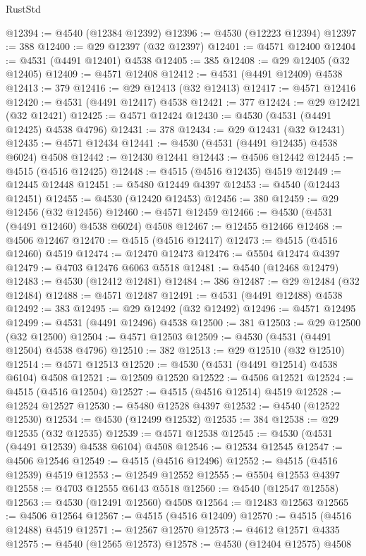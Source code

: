 \begin{lexlean}{RustStd}
\begin{coremodule}
@12394 := @4540 (@12384 @12392)
@12396 := @4530 (@12223 @12394)
@12397 := 388
@12400 := @29 @12397 (@32 @12397)
@12401 := @4571 @12400
@12404 := @4531 (@4491 @12401) @4538
@12405 := 385
@12408 := @29 @12405 (@32 @12405)
@12409 := @4571 @12408
@12412 := @4531 (@4491 @12409) @4538
@12413 := 379
@12416 := @29 @12413 (@32 @12413)
@12417 := @4571 @12416
@12420 := @4531 (@4491 @12417) @4538
@12421 := 377
@12424 := @29 @12421 (@32 @12421)
@12425 := @4571 @12424
@12430 := @4530 (@4531 (@4491 @12425) @4538 @4796)
@12431 := 378
@12434 := @29 @12431 (@32 @12431)
@12435 := @4571 @12434
@12441 := @4530 (@4531 (@4491 @12435) @4538 @6024) @4508
@12442 := @12430 @12441
@12443 := @4506 @12442
@12445 := @4515 (@4516 @12425)
@12448 := @4515 (@4516 @12435) @4519
@12449 := @12445 @12448
@12451 := @5480 @12449 @4397
@12453 := @4540 (@12443 @12451)
@12455 := @4530 (@12420 @12453)
@12456 := 380
@12459 := @29 @12456 (@32 @12456)
@12460 := @4571 @12459
@12466 := @4530 (@4531 (@4491 @12460) @4538 @6024) @4508
@12467 := @12455 @12466
@12468 := @4506 @12467
@12470 := @4515 (@4516 @12417)
@12473 := @4515 (@4516 @12460) @4519
@12474 := @12470 @12473
@12476 := @5504 @12474 @4397
@12479 := @4703 @12476 @6063 @5518
@12481 := @4540 (@12468 @12479)
@12483 := @4530 (@12412 @12481)
@12484 := 386
@12487 := @29 @12484 (@32 @12484)
@12488 := @4571 @12487
@12491 := @4531 (@4491 @12488) @4538
@12492 := 383
@12495 := @29 @12492 (@32 @12492)
@12496 := @4571 @12495
@12499 := @4531 (@4491 @12496) @4538
@12500 := 381
@12503 := @29 @12500 (@32 @12500)
@12504 := @4571 @12503
@12509 := @4530 (@4531 (@4491 @12504) @4538 @4796)
@12510 := 382
@12513 := @29 @12510 (@32 @12510)
@12514 := @4571 @12513
@12520 := @4530 (@4531 (@4491 @12514) @4538 @6104) @4508
@12521 := @12509 @12520
@12522 := @4506 @12521
@12524 := @4515 (@4516 @12504)
@12527 := @4515 (@4516 @12514) @4519
@12528 := @12524 @12527
@12530 := @5480 @12528 @4397
@12532 := @4540 (@12522 @12530)
@12534 := @4530 (@12499 @12532)
@12535 := 384
@12538 := @29 @12535 (@32 @12535)
@12539 := @4571 @12538
@12545 := @4530 (@4531 (@4491 @12539) @4538 @6104) @4508
@12546 := @12534 @12545
@12547 := @4506 @12546
@12549 := @4515 (@4516 @12496)
@12552 := @4515 (@4516 @12539) @4519
@12553 := @12549 @12552
@12555 := @5504 @12553 @4397
@12558 := @4703 @12555 @6143 @5518
@12560 := @4540 (@12547 @12558)
@12563 := @4530 (@12491 @12560) @4508
@12564 := @12483 @12563
@12565 := @4506 @12564
@12567 := @4515 (@4516 @12409)
@12570 := @4515 (@4516 @12488) @4519
@12571 := @12567 @12570
@12573 := @4612 @12571 @4335
@12575 := @4540 (@12565 @12573)
@12578 := @4530 (@12404 @12575) @4508

\end{coremodule}
\end{lexlean}
